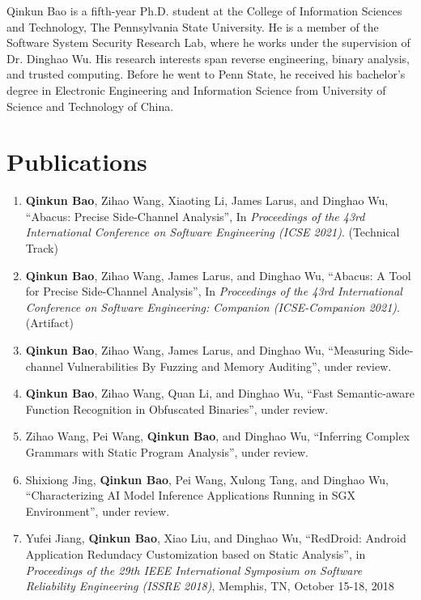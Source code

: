 
Qinkun Bao is a fifth-year Ph.D. student at the College of Information Sciences
and Technology, The Pennsylvania State University. He is a member of the Software 
System Security Research Lab, where he works under the supervision of Dr. Dinghao Wu.
His research interests span reverse engineering, binary analysis, and trusted computing. Before he went to Penn State, he received his bachelor's degree in Electronic Engineering and Information Science from University of Science and Technology of China.


  \section*{Publications}
  \begin{enumerate}
    \item \textbf{Qinkun Bao}, Zihao Wang, Xiaoting Li, James Larus, and Dinghao Wu, ``Abacus: Precise Side-Channel Analysis'', In \emph{Proceedings of the 43rd International Conference on Software Engineering (ICSE 2021)}. (Technical Track)
    \item \textbf{Qinkun Bao}, Zihao Wang, James Larus, and Dinghao Wu, ``Abacus: A Tool for Precise Side-Channel Analysis'', In \emph{Proceedings of the 43rd International Conference on Software Engineering: Companion (ICSE-Companion 2021)}. (Artifact)
    
    \item \textbf{Qinkun Bao}, Zihao Wang, James Larus, and Dinghao Wu, ``Measuring Side-channel Vulnerabilities
    By Fuzzing and Memory Auditing'', under review.

    \item \textbf{Qinkun Bao}, Zihao Wang, Quan Li, and Dinghao Wu, ``Fast Semantic-aware Function Recognition in Obfuscated Binaries'', under review.
    
    \item Zihao Wang, Pei Wang, \textbf{Qinkun Bao}, and Dinghao Wu, ``Inferring Complex Grammars with Static Program Analysis'', under review.
    
    \item Shixiong Jing, \textbf{Qinkun Bao}, Pei Wang, Xulong Tang, and Dinghao Wu, ``Characterizing AI Model Inference Applications Running in SGX Environment'', under review.
    
    \item Yufei Jiang, \textbf{Qinkun Bao}, Xiao Liu, and Dinghao Wu, ``RedDroid: Android Application Redundacy Customization based on Static Analysis'', in \emph{Proceedings of the 29th IEEE International Symposium on Software Reliability Engineering (ISSRE 2018)}, Memphis, TN, October 15-18, 2018
 

\end{enumerate}
